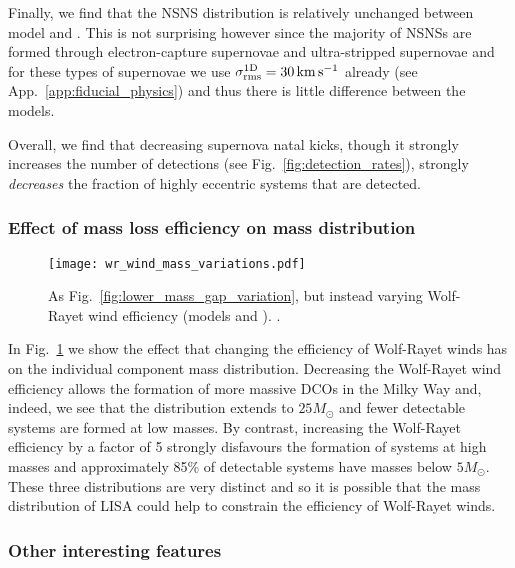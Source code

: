 Finally, we find that the NSNS distribution is relatively unchanged between model \modFid{} and \modSigLower{}. This is not surprising however since the majority of NSNSs are formed through electron-capture supernovae and ultra-stripped supernovae and for these types of supernovae we use $\sigma^{\rm 1D}_{\rm rms} = 30 \unit{km}{s^{-1}}$ already (see App.~\ref{app:fiducial_physics}) and thus there is little difference between the models.

Overall, we find that decreasing supernova natal kicks, though it strongly increases the number of detections (see Fig.~\ref{fig:detection_rates}), strongly \textit{decreases} the fraction of highly eccentric systems that are detected.

\subsubsection{Effect of mass loss efficiency on mass distribution}

\begin{figure}[tb]
    \centering
    \texttt{[image: wr\_wind\_mass\_variations.pdf]}
    \caption{As Fig.~\ref{fig:lower_mass_gap_variation}, but instead varying Wolf-Rayet wind efficiency (models \modWRLow{} and \modWRHigh{}). \href{https://github.com/TomWagg/detecting-DCOs-in-LISA/blob/main/paper/figures/wr_wind_mass_variations.pdf}{\faFileImage} \href{https://github.com/TomWagg/detecting-DCOs-in-LISA/blob/main/paper/figure_notebooks/variations.ipynb}{\faBook}.}
    \label{fig:wr_wind_mass_variations}
\end{figure}

In Fig.~\ref{fig:wr_wind_mass_variations} we show the effect that changing the efficiency of Wolf-Rayet winds has on the individual component mass distribution. Decreasing the Wolf-Rayet wind efficiency allows the formation of more massive DCOs in the Milky Way and, indeed, we see that the distribution extends to $25 \unit{M_{\odot}}$ and fewer detectable systems are formed at low masses. By contrast, increasing the Wolf-Rayet efficiency by a factor of 5 strongly disfavours the formation of systems at high masses and approximately 85\% of detectable systems have masses below $5 \unit{M_{\odot}}$. These three distributions are very distinct and so it is possible that the mass distribution of LISA could help to constrain the efficiency of Wolf-Rayet winds.

\subsubsection{Other interesting features}
